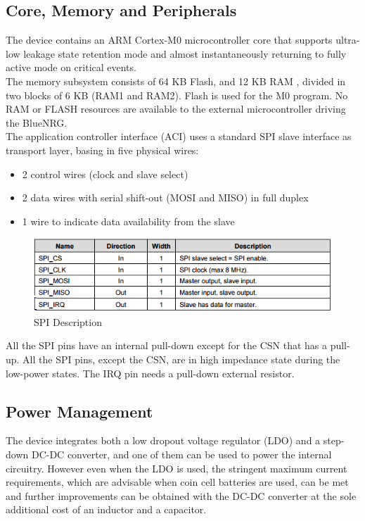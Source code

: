 \subsection{Core, Memory and Peripherals}
The device contains an ARM Cortex-M0 microcontroller core that supports ultra-low leakage state retention mode and almost instantaneously returning to fully active mode on critical events. \\
The memory subsystem consists of 64 KB Flash, and 12 KB RAM , divided in two blocks of 6 KB (RAM1 and RAM2). Flash is used for the M0 program. No RAM or FLASH resources are available to the external microcontroller driving the BlueNRG.\\
The application controller interface (ACI) uses a standard SPI slave interface as transport layer, basing in five physical wires:
\begin{itemize}
	\item 2 control wires (clock and slave select) 
	\item 2 data wires with serial shift-out (MOSI and MISO) in full duplex 
	\item 1 wire to indicate data availability from the slave
\end{itemize}
\begin{figure}[ht]
	\centering
	\includegraphics[scale=0.5]{images/spi_table.png}
	\caption{SPI Description}
\end{figure}
All the SPI pins have an internal pull-down except for the CSN that has a pull-up. All the SPI pins, except the CSN, are in high impedance state during the low-power states. The IRQ pin needs a pull-down external resistor.
\subsection{Power Management}
The device integrates both a low dropout voltage regulator (LDO) and a step-down DC-DC converter, and one of them can be used to power the internal circuitry. However even when the LDO is used, the stringent maximum current requirements, which are advisable when coin cell batteries are used, can be met and further improvements can be obtained with the DC-DC converter at the sole additional cost of an inductor and a capacitor.
